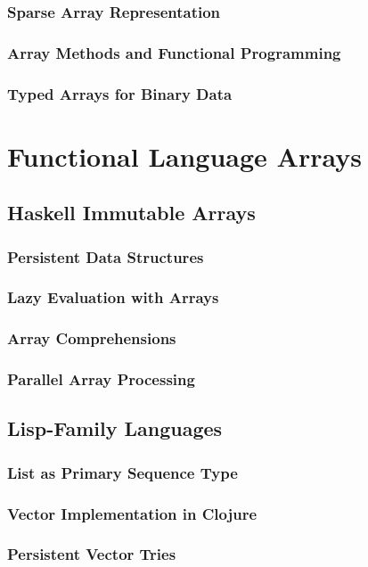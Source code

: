 \documentclass[12pt, oneside]{book}
\begin{document}
\subsubsection{Sparse Array Representation}
\subsubsection{Array Methods and Functional Programming}
\subsubsection{Typed Arrays for Binary Data}

\section{Functional Language Arrays}
\subsection{Haskell Immutable Arrays}
\subsubsection{Persistent Data Structures}
\subsubsection{Lazy Evaluation with Arrays}
\subsubsection{Array Comprehensions}
\subsubsection{Parallel Array Processing}

\subsection{Lisp-Family Languages}
\subsubsection{List as Primary Sequence Type}
\subsubsection{Vector Implementation in Clojure}
\subsubsection{Persistent Vector Tries}
\end{document}
